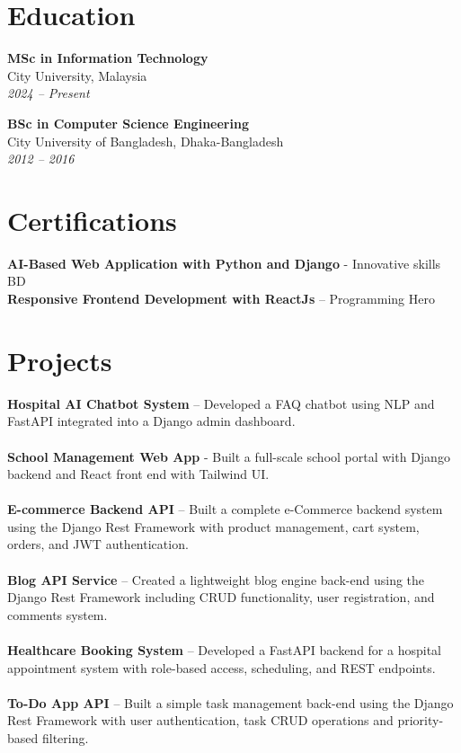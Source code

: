 \documentclass[a4paper,10pt]{article}
\begin{document}
\section*{Education}
\textbf{MSc in Information Technology} \\
City University, Malaysia \\
\textit{2024 – Present}

\textbf{BSc in Computer Science Engineering} \\
City University of Bangladesh, Dhaka-Bangladesh \\
\textit{2012 – 2016}\\

\section*{Certifications}
\textbf{AI-Based Web Application with Python and Django} - Innovative skills BD \\
\textbf{Responsive Frontend Development with ReactJs} – Programming Hero \\

\section*{Projects}
\textbf{Hospital AI Chatbot System} – Developed a FAQ chatbot using NLP and FastAPI integrated into a Django admin dashboard. \\\\
\textbf{School Management Web App} - Built a full-scale school portal with Django backend and React front end with Tailwind UI. \\\\
\textbf{E-commerce Backend API} – Built a complete e-Commerce backend system using the Django Rest Framework with product management, cart system, orders, and JWT authentication. \\\\
\textbf{Blog API Service} – Created a lightweight blog engine back-end using the Django Rest Framework including CRUD functionality, user registration, and comments system. \\\\
\textbf{Healthcare Booking System} – Developed a FastAPI backend for a hospital appointment system with role-based access, scheduling, and REST endpoints. \\\\
\textbf{To-Do App API} – Built a simple task management back-end using the Django Rest Framework with user authentication, task CRUD operations and priority-based filtering.  \\
\end{document}
